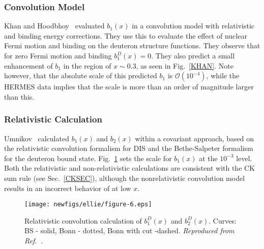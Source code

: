\subsubsection{Convolution Model}
Khan and Hoodbhoy~\cite{Khan:1991qk} evaluated $b_1(x)$ in a convolution model with relativistic and binding energy corrections.  They use this to evaluate the effect of nuclear Fermi motion and binding on the deuteron structure functions.  They observe that for zero Fermi motion and binding $b_1^D(x)=0$.  
They also predict a small enhancement of $b_1$ in the region of $x\sim 0.3$, as seen in Fig.~\ref{KHAN}.  Note however, that the absolute scale of this predicted $b_1$ is 
$\mathcal{O}(10^{-4})$, while the HERMES data implies that the scale is more than an order of magnitude larger than this.

\subsubsection{Relativistic Calculation}
Umnikov~\cite{Umnikov:1996qv} calculated $b_1(x)$ and $b_2(x)$ within a covariant approach,
based on the relativistic convolution formalism for DIS and the  Bethe-Salpeter formalism 
for the deuteron bound state.  Fig.~\ref{UMNIKOV} sets the scale for $b_1(x)$ at the $10^{-3}$ level.  Both the relativistic and non-relativistic calculations are consistent with the CK sum rule (see Sec.~\ref{CKSEC}), although the nonrelativistic convolution model results in an incorrect behavior of at low $x$.

\begin{figure}
\begin{center}
\texttt{[image: newfigs/ellie/figure-6.eps]}
\caption{\label{UMNIKOV} Relativistic convolution calculation of $b_1^D(x)$ and $b_2^D(x)$.  Curves: BS - solid, Bonn - dotted, Bonn with cut -dashed.
{\it Reproduced from Ref.~\cite{Umnikov:1996qv}.}
}
\end{center}
\end{figure}


%

